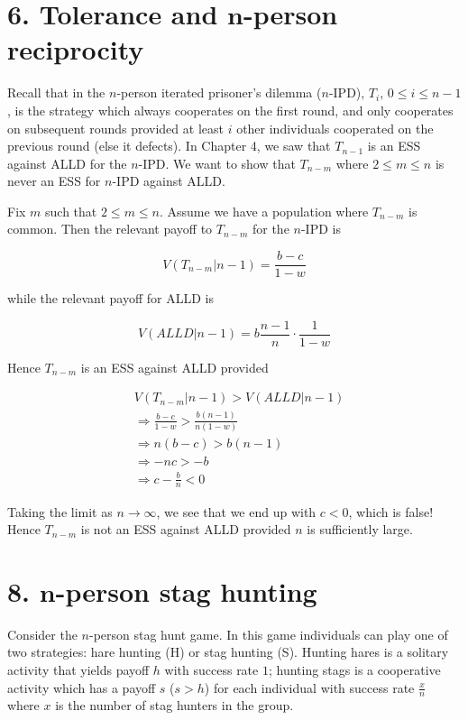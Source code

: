 \documentclass{article}
\begin{document}
\section*{6. Tolerance and $\boldsymbol{n}$-person reciprocity}

Recall that in the $n$-person iterated prisoner's dilemma ($n$-IPD),
$T_i$, $0 \leq i \leq n - 1$, is the strategy which always cooperates on
the first round, and only cooperates on subsequent rounds provided at
least $i$ other individuals cooperated on the previous round (else it
defects). In Chapter 4, we saw that $T_{n - 1}$ is an ESS against ALLD
for the $n$-IPD. We want to show that $T_{n - m}$ where $2 \leq m \leq
n$ is never an ESS for $n$-IPD against ALLD.

Fix $m$ such that $2 \leq m \leq n$. Assume we have a population where
$T_{n - m}$ is common. Then the relevant payoff to $T_{n - m}$ for the
$n$-IPD is

\begin{equation*}
    V(T_{n - m}|n - 1) = \frac{b - c}{1 - w}
\end{equation*}

while the relevant payoff for ALLD is

\begin{equation*}
    V(ALLD|n - 1) = b \frac{n - 1}{n} \cdot \frac{1}{1 - w}
\end{equation*}

Hence $T_{n - m}$ is an ESS against ALLD provided

\begin{align*}
    &V(T_{n - m}|n - 1) > V(ALLD|n - 1) \\
    &\Rightarrow \frac{b - c}{1 - w} > \frac{b (n - 1)}{n (1 - w)} \\
    &\Rightarrow n (b - c) > b (n - 1) \\
    &\Rightarrow - n c > - b \\
    &\Rightarrow c - \frac{b}{n} < 0
\end{align*}

Taking the limit as $n \to \infty$, we see that we end up with $c < 0$,
which is false! Hence $T_{n - m}$ is not an ESS against ALLD provided
$n$ is sufficiently large.

\section*{8. $\boldsymbol{n}$-person stag hunting}

Consider the $n$-person stag hunt game. In this game individuals can
play one of two strategies: hare hunting (H) or stag hunting (S).
Hunting hares is a solitary activity that yields payoff $h$ with success
rate $1$; hunting stags is a cooperative activity which has a payoff $s$
($s > h$) for each individual with success rate $\frac{x}{n}$ where $x$
is the number of stag hunters in the group.
\end{document}

